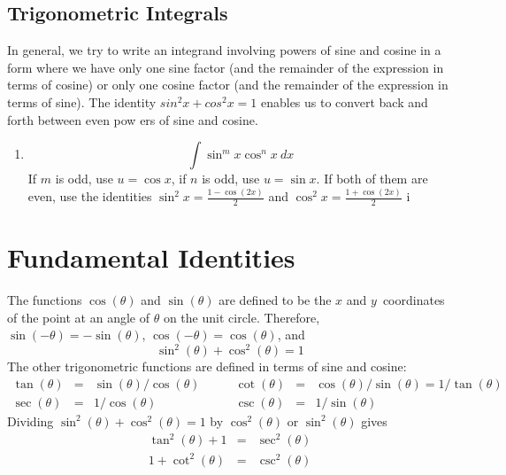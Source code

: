 \documentclass{article}
\begin{document}
\newpage

\subsection{Trigonometric Integrals}


In general, we try to write an integrand involving powers of sine and cosine in a form
where we have only one sine factor (and the remainder of the expression in terms of
cosine) or only one cosine factor (and the remainder of the expression in terms of sine).
The iden­tity $sin^2x+ cos^2x = 1$ enables us to convert back and forth between even pow­
ers of sine and cosine.
\begin{enumerate}[1.]
	\item \[ \int \sin^m{ x } \cos^n{ x } \ dx 
		\]
		If $ m $ is odd, use $ u= \cos{ x }  $, if $ n $ is odd, use $ u= \sin{ x }  $. If both of them are even, use the identities $ \sin^2{x} = \frac{ 1- \cos{ (2x) }  }{ 2 }  $ and $ \cos^2x = \frac{ 1+ \cos(2x) }{ 2 }  $  i


\end{enumerate}


\newpage

\thispagestyle{empty}

\section*{Fundamental Identities}
The functions $\cos(\theta)$ and $\sin(\theta)$ are defined to be the $x$
and $y$~coordinates of the point at an angle of $\theta$ on the unit circle.
Therefore,
$\sin(-\theta) = -\sin(\theta)$, $\cos(-\theta) = \cos(\theta)$, and
\[
\sin^2(\theta) + \cos^2(\theta) = 1
\] 
The other trigonometric functions are defined in terms of sine and cosine:
\[
\begin{array}{rclrcl}
\tan(\theta) &=& \sin(\theta)/\cos(\theta)\quad & \quad
\cot(\theta) &=& \cos(\theta)/\sin(\theta) = 1/\tan(\theta)\\
\sec(\theta) &=& 1/\cos(\theta)\quad & \quad
\csc(\theta) &=& 1/\sin(\theta)
\end{array}
\]
Dividing $\sin^2(\theta) + \cos^2(\theta) = 1$ by
$\cos^2(\theta)$ or $\sin^2(\theta)$ gives
\begin{eqnarray*}
\tan^2(\theta) + 1 &=& \sec^2(\theta)\\
1 + \cot^2(\theta) &=& \csc^2(\theta)
\end{eqnarray*}
\end{document}
